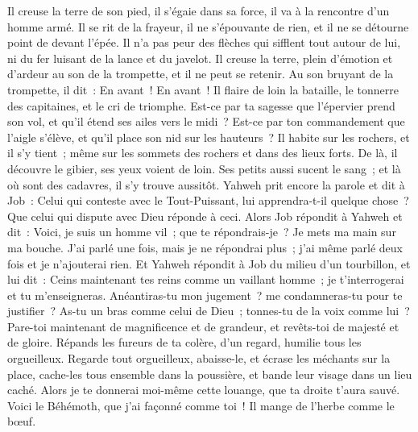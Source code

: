 \begin{multicols}{2}
Il creuse la terre de son pied, il s'égaie dans sa force, il va à la rencontre d'un homme armé.
Il se rit de la frayeur, il ne s'épouvante de rien, et il ne se détourne point de devant l'épée.
Il n'a pas peur des flèches qui sifflent tout autour de lui, ni du fer luisant de la lance et du javelot. 
Il creuse la terre, plein d'émotion et d'ardeur au son de la trompette, et il ne peut se retenir. 
Au son bruyant de la trompette, il dit~: En avant~! En avant~! Il flaire de loin la bataille, le tonnerre des capitaines, et le cri de triomphe.
Est-ce par ta sagesse que l'épervier prend son vol, et qu'il étend ses ailes vers le midi~?
Est-ce par ton commandement que l'aigle s'élève, et qu'il place son nid sur les hauteurs~?
Il habite sur les rochers, et il s'y tient~; même sur les sommets des rochers et dans des lieux forts. 
De là, il découvre le gibier, ses yeux voient de loin.
Ses petits aussi sucent le sang~; et là où sont des cadavres, il s'y trouve aussitôt.
Yahweh prit encore la parole et dit à Job~:
Celui qui conteste avec le Tout-Puissant, lui apprendra-t-il quelque chose~? Que celui qui dispute avec Dieu réponde à ceci.
Alors Job répondit à Yahweh et dit~:
Voici, je suis un homme vil~; que te répondrais-je~? Je mets ma main sur ma bouche.
J'ai parlé une fois, mais je ne répondrai plus~; j'ai même parlé deux fois et je n'ajouterai rien.
\VerseOne{}Et Yahweh répondit à Job du milieu d'un tourbillon, et lui dit~:
Ceins maintenant tes reins comme un vaillant homme~; je t'interrogerai et tu m'enseigneras.
Anéantiras-tu mon jugement~? me condamneras-tu pour te justifier~?
As-tu un bras comme celui de Dieu~; tonnes-tu de la voix comme lui~?
Pare-toi maintenant de magnificence et de grandeur, et revêts-toi de majesté et de gloire.
Répands les fureurs de ta colère, d'un regard, humilie tous les orgueilleux.
Regarde tout orgueilleux, abaisse-le, et écrase les méchants sur la place,
cache-les tous ensemble dans la poussière, et bande leur visage dans un lieu caché. 
Alors je te donnerai moi-même cette louange, que ta droite t'aura sauvé. 
Voici le Béhémoth, que j'ai façonné comme toi~! Il mange de l'herbe comme le bœuf.

\end{multicols}
